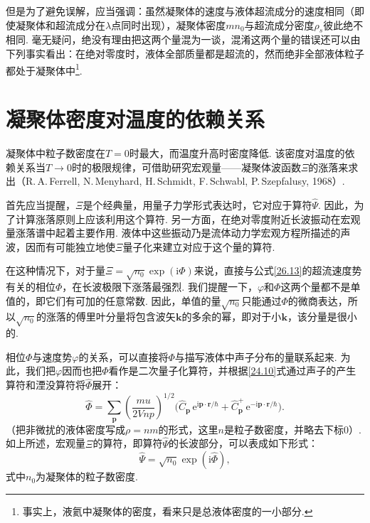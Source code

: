 但是为了避免误解，应当强调：虽然凝聚体的速度与液体超流成分的速度相同（即使凝聚体和超流成分在$\lambda$点同时出现），凝聚体密度$mn_{0}$与超流成分密度$\rho_{s}$彼此绝不相同. 毫无疑问，绝没有理由把这两个量混为一谈，混淆这两个量的错误还可以由下列事实看出：在绝对零度时，液体全部质量都是超流的，然而绝非全部液体粒子都处于凝聚体中\footnote{事实上，液氦中凝聚体的密度，看来只是总液体密度的一小部分.}.

\section{凝聚体密度对温度的依赖关系}

凝聚体中粒子数密度在$T=0$时最大，而温度升高时密度降低. 该密度对温度的依赖关系当$T\to 0$时的极限规律，可借助研究宏观量——凝聚体波函数$\Xi$的涨落来求出（R.\,A.\,Ferrell, N.\,Menyhard, H.\,Schmidt, F.\,Schwabl, P.\,Szepfalusy, 1968）.

首先应当提醒，$\Xi$是个经典量，用量子力学形式表达时，它对应于算符$\hat{\Psi}$. 因此，为了计算涨落原则上应该利用这个算符. 另一方面，在绝对零度附近长波振动在宏观量涨落谱中起着主要作用. 液体中这些振动乃是流体动力学宏观方程所描述的声波，因而有可能独立地使$\Xi$量子化来建立对应于这个量的算符.

在这种情况下，对于量$\Xi=\sqrt{n_{0}}\exp(\mathrm{i}\Phi)$来说，直接与公式\eqref{26.13}的超流速度势有关的相位$\Phi$，在长波极限下涨落最强烈. 我们提醒一下，$\varphi$和$\Phi$这两个量都不是单值的，即它们有可加的任意常数. 因此，单值的量$\sqrt{n_{0}}$只能通过$\Phi$的微商表达，所以$\sqrt{n_{0}}$的涨落的傅里叶分量将包含波矢$\bm{k}$的多余的幂，即对于小$\bm{k}$，该分量是很小的.

相位$\Phi$与速度势$\varphi$的关系，可以直接将$\Phi$与描写液体中声子分布的量联系起来. 为此，我们把$\varphi$因而也把$\Phi$看作是二次量子化算符，并根据\eqref{24.10}式通过声子的产生算符和湮没算符将$\hat{\Phi}$展开：
\begin{equation}
\hat{\Phi}=\sum_{\bm{p}}\left(\frac{mu}{2Vnp}\right)^{1/2}
\bigl(\hat{C}_{\bm{p}}\,\mathrm{e}^{\mathrm{i}\bm{p}\cdot\bm{r}/\hbar}
+\hat{C}^{+}_{\bm{p}}\,\mathrm{e}^{-\mathrm{i}\bm{p}\cdot\bm{r}/\hbar}\bigr).
\label{27.1}
\end{equation}
（把非微扰的液体密度写成$\rho=nm$的形式，这里$n$是粒子数密度，并略去下标0）. 如上所述，宏观量$\Xi$的算符，即算符$\hat{\Psi}$的长波部分，可以表成如下形式：
\begin{equation}
\hat{\Psi}=\sqrt{n_{0}}\exp(\mathrm{i}\hat{\Phi}),
\label{27.2}
\end{equation}
式中$n_{0}$为凝聚体的粒子数密度.

